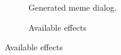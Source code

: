 \begin{figure}
\begin{subfigure}{0.3\textwidth}
        \caption{Generated meme dialog.}
        \label{fig:imgflip-generated-meme}
    \end{subfigure}
    \begin{subfigure}{0.3\textwidth}
        \centering
        \caption{Available effects}
        \label{fig:imgflip-effects}
    \end{subfigure}
\end{figure}
